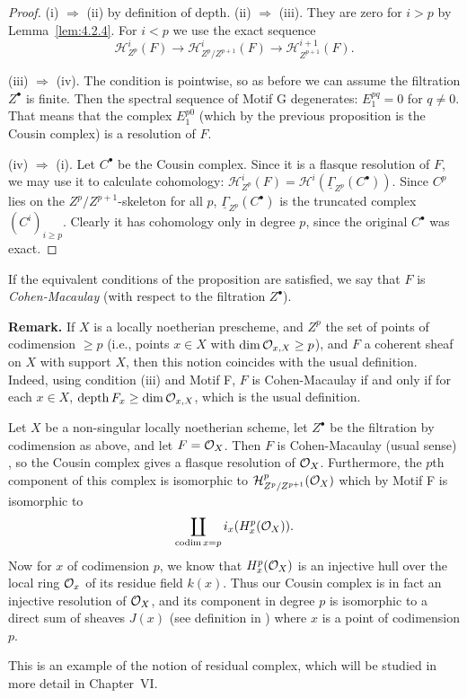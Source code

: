 \begin{proof}
(i) $\Longrightarrow$ (ii) by definition of depth. (ii) $\Longrightarrow$ (iii). They are zero for $i>p$ by Lemma~\ref{lem:4.2.4}. For $i<p$ we use the exact sequence
\[
\mathcal{H}_{Z^{p}}^{i}(F)\longrightarrow \mathcal{H}_{Z^{p}/Z^{p+1}}^{i}(F)\longrightarrow \mathcal{H}_{Z^{p+1}}^{i+1}(F).
\]

(iii) $\Longrightarrow$ (iv). The condition is pointwise, so as before we can assume the filtration $Z^\bullet$ is finite. Then the spectral sequence of Motif G degenerates: $E_1^{pq}=0$ for $q\neq 0$. That means that the complex $E_1^{p0}$ (which by the previous proposition is the Cousin complex) is a resolution of $F$.

(iv) $\Longrightarrow$ (i). Let $C^\bullet$ be the Cousin complex. Since it is a flasque resolution of $F$, we may use it to calculate cohomology: $\mathcal{H}_{Z^p}^{i}(F)=\mathcal{H}^i(\underline{\Gamma}_{Z^p}(C^\bullet))$. Since $C^p$ lies on the $Z^p/Z^{p+1}$-skeleton for all $p$, $\underline{\Gamma}_{Z^p}(C^\bullet)$ is the truncated complex $(C^i)_{i\geq p}$. Clearly it has cohomology only in degree $p$, since the original $C^\bullet$ was exact.
\end{proof}

\begin{definition*}
If the equivalent conditions of the proposition are satisfied, we say that $F$ is \emph{Cohen-Macaulay} (with respect to the filtration $Z^\bullet$).
\end{definition*}

\par\medskip\noindent\textbf{Remark.}
If $X$ is a locally noetherian prescheme, and $Z^p$ the set of points of codimension $\geq p$ (i.e., points $x\in X$ with $\dim\mathcal{O}_{x,X}\geq p$), and $F$ a coherent sheaf on $X$ with support $X$, then this notion coincides with the usual definition. Indeed, using condition (iii) and Motif F, $F$ is Cohen-Macaulay if and only if for each $x\in X$, $\operatorname{depth}F_x\geq\dim\mathcal{O}_{x,X}$, which is the usual definition.
\par\medskip

\begin{example*}
Let $X$ be a non-singular locally noetherian scheme, let $Z^\bullet$ be the filtration by codimension as above, and let $F=\mathcal{O}_X$. Then $F$ is Cohen-Macaulay (usual sense) \cite[\nopp vol.~II, App.~6]{ZS}, so the Cousin complex gives a flasque resolution of $\mathcal{O}_X$. Furthermore, the $p$th component of this complex is isomorphic to $\mathcal{H}_{Z^p/Z^{p+1}}^{p}(\mathcal{O}_X)$ which by Motif F is isomorphic to
\[
\coprod_{\operatorname{codim} x = p} i_x(H_x^{p}(\mathcal{O}_X)).
\]
Now for $x$ of codimension $p$, we know \cite[]{LC} that $H_x^p(\mathcal{O}_X)$ is an injective hull over the local ring $\mathcal{O}_x$ of its residue field $k(x)$. Thus our Cousin complex is in fact an injective resolution of $\mathcal{O}_X$, and its component in degree $p$ is isomorphic to a direct sum of sheaves $J(x)$ (see definition in ) where $x$ is a point of codimension $p$.

This is an example of the notion of residual complex, which will be studied in more detail in Chapter~VI.
\end{example*}


